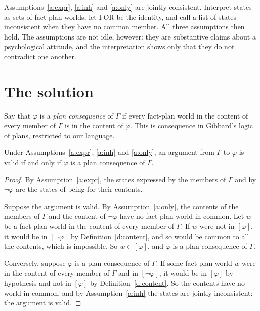 \documentclass{situationist-preprint}
\begin{document}
\begin{remark}\label{r:model}
Assumptions~\ref{a:expr}, \ref{a:inh} and \ref{a:only} are jointly consistent. Interpret states as sets of fact-plan worlds, let $\mathrm{FOR}$ be the identity, and call a list of states inconsistent when they have no common member. All three assumptions then hold. The assumptions are not idle, however: they are substantive claims about a psychological attitude, and the interpretation shows only that they do not contradict one another.
\end{remark}

\section{The solution}\label{s:solution}

Say that $\varphi$ is a \emph{plan consequence} of $\Gamma$ if every fact-plan world in the content of every member of $\Gamma$ is in the content of $\varphi$. This is consequence in Gibbard's logic of plans, restricted to our language.

\begin{theorem}\label{t:main}
Under Assumptions~\ref{a:expr}, \ref{a:inh} and \ref{a:only}, an argument from $\Gamma$ to $\varphi$ is valid if and only if $\varphi$ is a plan consequence of $\Gamma$.
\end{theorem}

\begin{proof}
By Assumption~\ref{a:expr}, the states expressed by the members of $\Gamma$ and by $\neg\varphi$ are the states of being for their contents.

Suppose the argument is valid. By Assumption~\ref{a:only}, the contents of the members of $\Gamma$ and the content of $\neg\varphi$ have no fact-plan world in common. Let $w$ be a fact-plan world in the content of every member of $\Gamma$. If $w$ were not in $[\varphi]$, it would be in $[\neg\varphi]$ by Definition~\ref{d:content}, and so would be common to all the contents, which is impossible. So $w\in[\varphi]$, and $\varphi$ is a plan consequence of $\Gamma$.

Conversely, suppose $\varphi$ is a plan consequence of $\Gamma$. If some fact-plan world $w$ were in the content of every member of $\Gamma$ and in $[\neg\varphi]$, it would be in $[\varphi]$ by hypothesis and not in $[\varphi]$ by Definition~\ref{d:content}. So the contents have no world in common, and by Assumption~\ref{a:inh} the states are jointly inconsistent: the argument is valid.
\end{proof}
\end{document}
